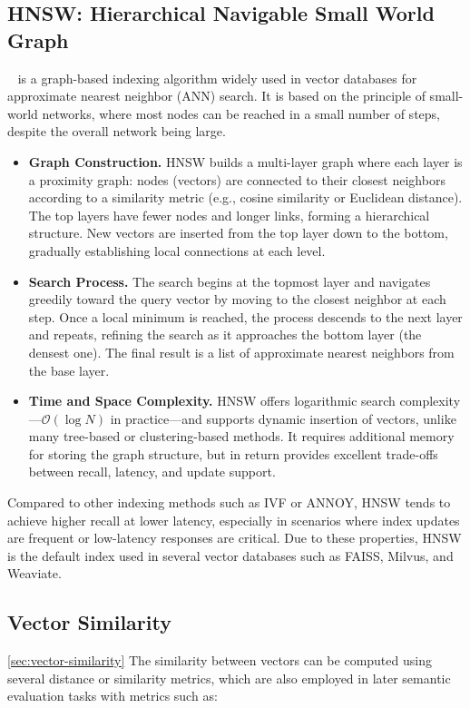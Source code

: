 \subsection{HNSW: Hierarchical Navigable Small World Graph}

~\cite{malkov2018efficient} is a graph-based indexing algorithm widely used in vector databases for approximate nearest neighbor (\gls{ANN}) search. It is based on the principle of small-world networks, where most nodes can be reached in a small number of steps, despite the overall network being large.

\begin{itemize}
    \item \textbf{Graph Construction.} HNSW builds a multi-layer graph where each layer is a proximity graph: nodes (vectors) are connected to their closest neighbors according to a similarity metric (e.g., cosine similarity or Euclidean distance). The top layers have fewer nodes and longer links, forming a hierarchical structure. New vectors are inserted from the top layer down to the bottom, gradually establishing local connections at each level.

    \item \textbf{Search Process.} The search begins at the topmost layer and navigates greedily toward the query vector by moving to the closest neighbor at each step. Once a local minimum is reached, the process descends to the next layer and repeats, refining the search as it approaches the bottom layer (the densest one). The final result is a list of approximate nearest neighbors from the base layer.

    \item \textbf{Time and Space Complexity.} HNSW offers logarithmic search complexity—$\mathcal{O}(\log N)$ in practice—and supports dynamic insertion of vectors, unlike many tree-based or clustering-based methods. It requires additional memory for storing the graph structure, but in return provides excellent trade-offs between recall, latency, and update support.
\end{itemize}

Compared to other indexing methods such as IVF or ANNOY, HNSW tends to achieve higher recall at lower latency, especially in scenarios where index updates are frequent or low-latency responses are critical. Due to these properties, HNSW is the default index used in several vector databases such as FAISS, Milvus, and Weaviate.

\subsection{Vector Similarity}
\ref{sec:vector-similarity}
The similarity between vectors can be computed using several distance or similarity metrics, which are also employed in later semantic evaluation tasks with metrics such as:

